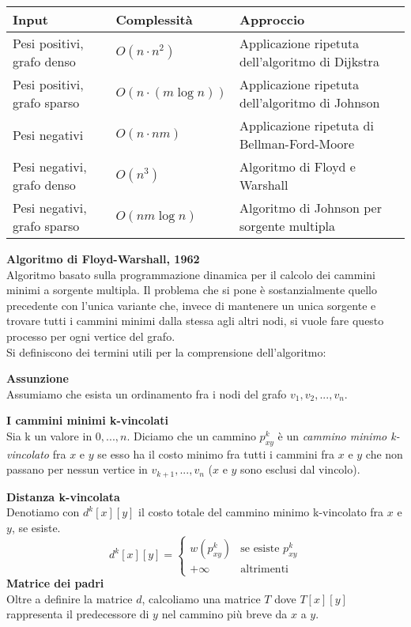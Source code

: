 \documentclass[../cheatSheetAlgoritmi.tex]{subfiles}
\begin{document}
\bigskip
\begin{table}[H]
	\centering
	\small
	\setlength\tabcolsep{2pt}
	\begin{tabular}{@{}lll@{}}
		\toprule
		Input & Complessità & Approccio  \\ \midrule
		
		Pesi positivi, grafo denso       &  $O(n \cdot n^2)$ & Applicazione ripetuta dell’algoritmo di Dijkstra   \\
		
		Pesi positivi, grafo sparso        &  $O(n \cdot (m \log n))$ &  Applicazione ripetuta dell’algoritmo di Johnson   \\
		
		Pesi negativi &  $O(n \cdot nm)$ & Applicazione ripetuta di Bellman-Ford-Moore  \\
		
		Pesi negativi, grafo denso &  $O(n^3)$ & Algoritmo di Floyd e Warshall   \\
		
		Pesi negativi, grafo sparso               & $O(nm \log n)$ & Algoritmo di Johnson per sorgente multipla    \\ \bottomrule
		\end{tabular}
\end{table}


\bigskip
\bigskip
\textbf{Algoritmo di Floyd-Warshall, 1962} \\
Algoritmo basato sulla programmazione dinamica per il calcolo dei cammini minimi a sorgente multipla. Il problema che si pone è sostanzialmente quello precedente con l'unica variante che, invece di mantenere un unica sorgente e trovare tutti i cammini minimi dalla stessa agli altri nodi, si vuole fare questo processo per ogni vertice del grafo.  \\
Si definiscono dei termini utili per la comprensione dell'algoritmo:

\bigskip
\textbf{Assunzione}  \\
Assumiamo che esista un ordinamento fra i nodi del grafo $v_1 , v_2 , ... , v_n$.

\bigskip
\textbf{I cammini minimi k-vincolati} \\
Sia k un valore in ${0, ...,  n}$. Diciamo che un cammino $p^{k}_{xy}$ è un
\emph{cammino minimo k-vincolato} fra $x$ e $y$ se esso ha il costo minimo fra tutti i cammini fra $x$ e $y$ che non passano per nessun vertice in $v_{k+1} , . . . , v_n$ ($x$ e $y$ sono esclusi dal vincolo).

\bigskip
\textbf{Distanza k-vincolata} \\
Denotiamo con $d^{k}[x][y]$ il costo totale del cammino minimo k-vincolato fra $x$ e $y$, se esiste.
\[
  d^{k}[x][y]=\begin{cases}
               w(p^{k}_{xy}) & \text{se esiste }p^{k}_{xy}\\
               +\infty & \text{altrimenti}
            \end{cases}
\]
\textbf{Matrice dei padri} \\
Oltre a definire la matrice $d$, calcoliamo una matrice $T$ dove $T[x][y]$ rappresenta il predecessore di $y$ nel cammino più breve da $x$ a $y$.
\end{document}
